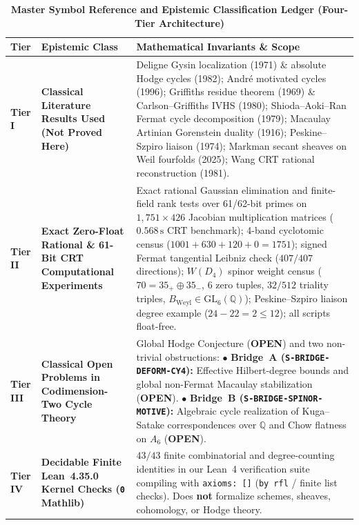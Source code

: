 \documentclass[11pt,a4paper]{article}
\theoremstyle{definition}
\theoremstyle{remark}
\begin{document}
\begin{table}[htbp]
\centering
\small
\caption{\textbf{Master Symbol Reference and Epistemic Classification Ledger (Four-Tier Architecture)}}
\label{tab:epistemic_ledger}
\begin{tabular}{lp{5.4cm}p{7.2cm}}
\toprule
\textbf{Tier} & \textbf{Epistemic Class} & \textbf{Mathematical Invariants \& Scope} \\
\midrule
\textbf{Tier I} & \textbf{Classical Literature Results Used (Not Proved Here)} &
Deligne Gysin localization (1971) \& absolute Hodge cycles (1982); Andr\'e motivated cycles (1996); Griffiths residue theorem (1969) \& Carlson--Griffiths IVHS (1980); Shioda--Aoki--Ran Fermat cycle decomposition (1979); Macaulay Artinian Gorenstein duality (1916); Peskine--Szpiro liaison (1974); Markman secant sheaves on Weil fourfolds (2025); Wang CRT rational reconstruction (1981). \\
\addlinespace
\textbf{Tier II} & \textbf{Exact Zero-Float Rational \& 61-Bit CRT Computational Experiments} &
Exact rational Gaussian elimination and finite-field rank tests over 61/62-bit primes on $1,751 \times 426$ Jacobian multiplication matrices ($0.568\,\mathrm{s}$ CRT benchmark); 4-band cyclotomic census ($1001+630+120+0=1751$); signed Fermat tangential Leibniz check ($407/407$ directions); $W(D_4)$ spinor weight census ($70 = 35_+ \oplus 35_-$, $6$ zero tuples, $32/512$ triality triples, $B_{\mathrm{Weyl}} \in \mathrm{GL}_6(\mathbb{Q})$); Peskine--Szpiro liaison degree example ($24 - 22 = 2 \le 12$); all scripts float-free. \\
\addlinespace
\textbf{Tier III} & \textbf{Classical Open Problems in Codimension-Two Cycle Theory} &
Global Hodge Conjecture (\textbf{OPEN}) and two non-trivial obstructions:
$\bullet$ \textbf{Bridge~A (\texttt{S-BRIDGE-DEFORM-CY4}):} Effective Hilbert-degree bounds and global non-Fermat Macaulay stabilization (\textbf{OPEN}).
$\bullet$ \textbf{Bridge~B (\texttt{S-BRIDGE-SPINOR-MOTIVE}):} Algebraic cycle realization of Kuga--Satake correspondences over $\mathbb{Q}$ and Chow flatness on $A_6$ (\textbf{OPEN}). \\
\addlinespace
\textbf{Tier IV} & \textbf{Decidable Finite Lean~4.35.0 Kernel Checks (\texttt{0} Mathlib)} &
$43/43$ finite combinatorial and degree-counting identities in our Lean~4 verification suite compiling with \texttt{axioms: []} (\texttt{by rfl} / finite list checks). Does \textbf{not} formalize schemes, sheaves, cohomology, or Hodge theory. \\
\bottomrule
\end{tabular}
\end{table}
\end{document}
